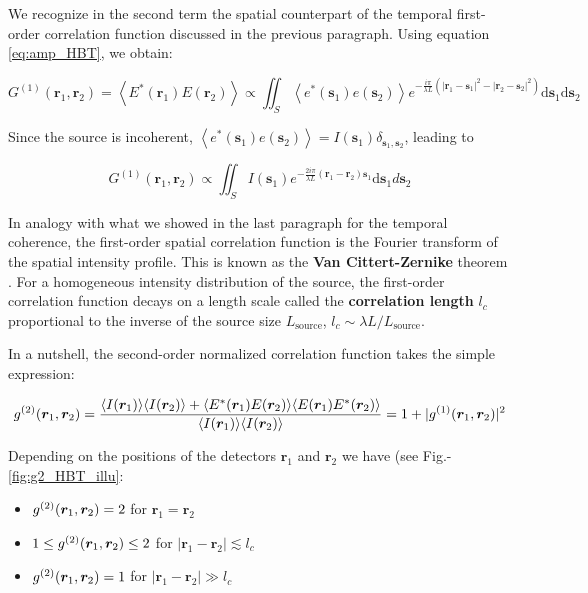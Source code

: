 \noindent We recognize in the second term the spatial counterpart of the temporal first-order correlation function discussed in the previous paragraph. Using equation \ref{eq:amp_HBT}, we obtain:

\begin{equation}
    G^{(1)}\left(\bm{r}_{1}, \bm{r}_{2}\right)=\left\langle E^*(\bm{r}_1) E(\bm{r}_2)\right\rangle \propto \iint_{S}\left\langle e^{*}(\bm{s}_1) e(\bm{s}_2)\right\rangle e^{-\frac{i \pi}{\lambda L}\left(\left|\bm{r}_{1}-\bm{s}_1\right|^{2}-\left|\bm{r}_{2}-\bm{s}_2\right|^{2}\right)} \mathrm{d} \bm{s}_1 \mathrm{d} \bm{s}_2
\end{equation}

\noindent Since the source is incoherent, $\left\langle e^{*}(\bm{s}_1) e(\bm{s}_2)\right\rangle = I(\bm{s}_1) \delta_{\bm{s}_1,\bm{s}_2}$, leading to

\begin{equation}
    G^{(1)}\left(\bm{r}_{1}, \bm{r}_{2}\right) \propto \iint_{S} I(\bm{s}_1) e^{-\frac{2 i \pi}{\lambda L}\left(\bm{r}_{1}-\bm{r}_{2}\right) \bm{s}_1} \mathrm{d} \bm{s}_1 d \bm{s}_2
\end{equation}

\noindent In analogy with what we showed in the last paragraph for the temporal coherence, the first-order spatial correlation function is the Fourier transform of the spatial intensity profile. This is known as the \textbf{Van Cittert-Zernike} theorem \cite{goodman2007speckle}. For a homogeneous intensity distribution of the source, the first-order correlation function decays on a length scale called the \textbf{correlation length} $l_c$ proportional to the inverse of the source size $L_{\mathrm{source}}$, $l_c \sim \lambda L / L_{\mathrm{source}}$.

In a nutshell, the second-order normalized correlation function takes the simple expression:

\begin{equation}
    g^{(2)} (\bm{r}_1,\bm{r}_2) = \frac{\langle I(\bm{r}_1)\rangle \langle I(\bm{r}_2)\rangle + \langle E^*(\bm{r}_1) E(\bm{r}_2)\rangle \langle E(\bm{r}_1) E^*(\bm{r}_2)\rangle}{\langle I(\bm{r}_1)\rangle\langle I(\bm{r}_2)\rangle} = 1 + |g^{(1)}(\bm{r}_1,\bm{r}_2)|^2
\end{equation}

\noindent Depending on the positions of the detectors $\bm{r}_1$ and $\bm{r}_2$ we have (see Fig.-\ref{fig:g2_HBT_illu}:

\begin{itemize}
    \item $g^{(2)} (\bm{r}_1,\bm{r}_2)=2$ for $\bm{r}_1=\bm{r}_2$
    \item $1 \leq g^{(2)} (\bm{r}_1,\bm{r}_2) \leq 2$ for $|\bm{r}_1-\bm{r}_2| \lesssim l_{c}$
    \item $g^{(2)} (\bm{r}_1,\bm{r}_2)=1$ for $|\bm{r}_1-\bm{r}_2| \gg l_{c}$
\end{itemize}

